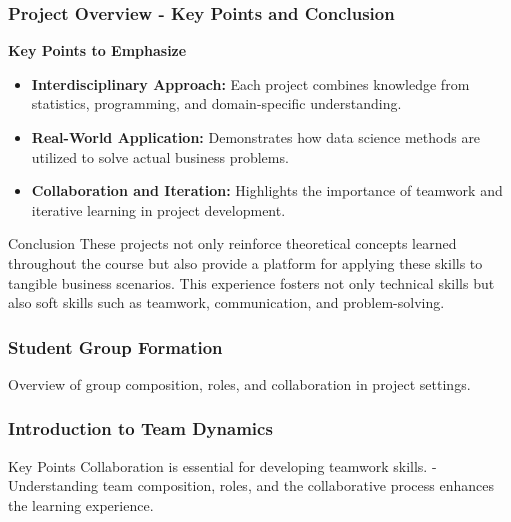 \documentclass[aspectratio=169]{beamer}
\begin{document}
\begin{frame}[fragile]
    \frametitle{Project Overview - Key Points and Conclusion}
    \textbf{Key Points to Emphasize}
    \begin{itemize}
        \item \textbf{Interdisciplinary Approach:} Each project combines knowledge from statistics, programming, and domain-specific understanding.
        \item \textbf{Real-World Application:} Demonstrates how data science methods are utilized to solve actual business problems.
        \item \textbf{Collaboration and Iteration:} Highlights the importance of teamwork and iterative learning in project development.
    \end{itemize}

    \vspace{1em}
    
    \begin{block}{Conclusion}
        These projects not only reinforce theoretical concepts learned throughout the course but also provide a platform for applying these skills to tangible business scenarios. This experience fosters not only technical skills but also soft skills such as teamwork, communication, and problem-solving.
    \end{block}
\end{frame}

\begin{frame}[fragile]
    \frametitle{Student Group Formation}
    Overview of group composition, roles, and collaboration in project settings.
\end{frame}

\begin{frame}[fragile]
    \frametitle{Introduction to Team Dynamics}
    \begin{block}{Key Points}
        Collaboration is essential for developing teamwork skills. 
        - Understanding team composition, roles, and the collaborative process enhances the learning experience.
    \end{block}
\end{frame}
\end{document}
